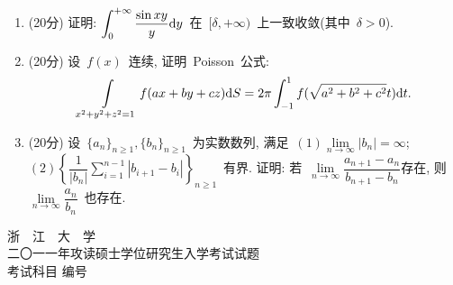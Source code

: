\documentclass[UTF8,a4paper,11pt]{article}
\begin{document}
\begin{enumerate}
	\item (20分) 证明: $\displaystyle\int_0^{+\infty}\dfrac{\sin{xy}}{y}\mathrm{d}y$~在~$[\delta,+\infty)$~上一致收敛(其中~$\delta>0$).
	      \vspace{2em}
	\item (20分) 设~$f(x)$~连续, 证明~Poisson~公式:
	      \[\int\limits_{x^2+y^2+z^2=1} f(ax+by+cz)\mathrm{d}S=2\pi\int_{-1}^1f(\sqrt{a^2+b^2+c^2}t)\mathrm{d}t.\]
	      \vspace{2em}
	\item (20分) 设~$\{a_n\}_{n\geqslant 1},\{b_n\}_{n\geqslant 1}$~为实数数列, 满足~$(1) \lim\limits_{n\to\infty}|b_n|=\infty$; $(2)\left\{ \dfrac{1}{|b_n|}\sum\limits_{i=1}^{n-1}|b_{i+1}-b_i|\right\}_{n\geqslant 1}$~有界. 证明: 若~$\lim\limits_{n\to\infty}\dfrac{a_{n+1}-a_n}{b_{n+1}-b_n}$存在, 则~$\lim\limits_{n\to\infty}\dfrac{a_n}{b_n}$~也存在.
	      \vspace{2em}
\end{enumerate}

\newpage
\setcounter{page}{1}
\begin{center}
	{\Huge 浙~~江~~大~~学}\\
	\setlength{\parskip}{5pt}
	{\Large 二〇一一年攻读硕士学位研究生入学考试试题}\\
	\setlength{\parskip}{10 pt}
	{\Large 考试科目\underline{} 编号\underline{}}
\end{center}
\end{document}
